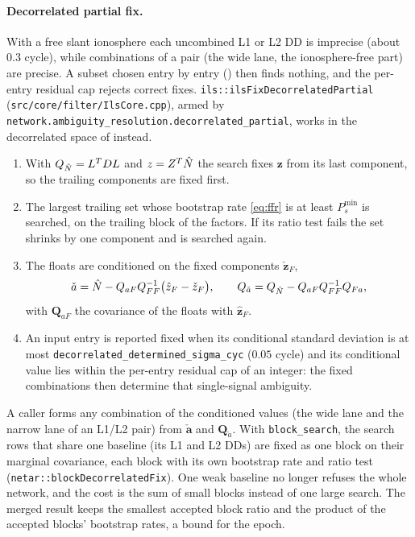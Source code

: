 \documentclass[main.tex]{subfiles}
\begin{document}
\paragraph{Decorrelated partial fix.}
With a free slant ionosphere each uncombined L1 or L2 DD is imprecise (about
$0.3$ cycle), while combinations of a pair (the wide lane, the
ionosphere-free part) are precise.  A subset chosen entry by entry
() then finds nothing, and the per-entry residual cap
rejects correct fixes.  \texttt{ils::ilsFixDecorrelatedPartial}
(\texttt{src/core/filter/IlsCore.cpp}), armed by
\texttt{network.ambiguity\_resolution.decorrelated\_partial}, works in the
decorrelated space of  instead.
\begin{enumerate}[leftmargin=*, itemsep=0pt]
\item With $Q_{\hat N} = L^{T}DL$ and $z = Z^{T}\hat{N}$
  the search fixes $\bm{z}$ from its last component, so the trailing
  components are fixed first.
\item The largest trailing set whose bootstrap rate \eqref{eq:ffr} is at
  least $P_s^{\min}$ is searched, on the trailing block of the factors.  If its
  ratio test fails the set shrinks by one component and is searched again.
\item The floats are conditioned on the fixed components $\check{\bm{z}}_F$,
  \begin{equation}
  \check{a} = \hat{N} - Q_{aF}Q_{FF}^{-1}\bigl(\hat{z}_F - \check{z}_F\bigr),
  \qquad
  Q_{\check a} = Q_{\hat N} - Q_{aF}Q_{FF}^{-1}Q_{Fa},
  \label{eq:ar-cond}
  \end{equation}
  with $\bm{Q}_{aF}$ the covariance of the floats with $\hat{\bm{z}}_F$.
\item An input entry is reported fixed when its conditional standard
  deviation is at most \texttt{decorrelated\_determined\_sigma\_cyc}
  ($0.05$ cycle) and its conditional value lies within the per-entry residual
  cap of an integer: the fixed combinations then determine that single-signal
  ambiguity.
\end{enumerate}
A caller forms any combination of the conditioned values (the wide lane and
the narrow lane of an L1/L2 pair) from $\check{\bm{a}}$ and
$\bm{Q}_{\check a}$.  With \texttt{block\_search}, the search rows that share
one baseline (its L1 and L2 DDs) are fixed as one block on their marginal
covariance, each block with its own bootstrap rate and ratio test
(\texttt{netar::blockDecorrelatedFix}).  One weak baseline no longer refuses
the whole network, and the cost is the sum of small blocks instead of one
large search.  The merged result keeps the smallest accepted block ratio and
the product of the accepted blocks' bootstrap rates, a bound for the epoch.
\end{document}
